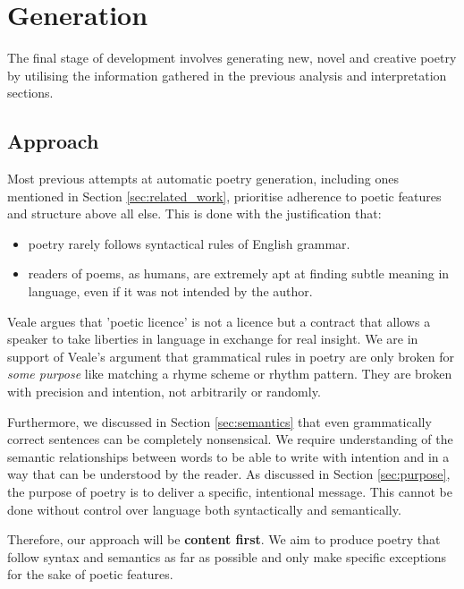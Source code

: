 \chapter{Generation}
\label{chp:generation}
\ifpdf
    \graphicspath{{Management/ManagementFigs/PNG/}{Management/ManagementFigs/PDF/}{Management/ManagementFigs/}}
\else
    \graphicspath{{Management/ManagementFigs/EPS/}{Management/ManagementFigs/}}
\fi

The final stage of development involves generating new, novel and creative poetry by utilising the information gathered in the previous analysis and interpretation sections.

\section{Approach}
Most previous attempts at automatic poetry generation, including ones mentioned in Section \ref{sec:related_work}, prioritise adherence to poetic features and structure above all else. This is done with the justification that:
\begin{itemize}
\item{poetry rarely follows syntactical rules of English grammar.}
\item{readers of poems, as humans, are extremely apt at finding subtle meaning in language, even if it was not intended by the author.}
\end{itemize}

Veale argues that 'poetic licence' is not a licence but a contract that allows a speaker to take liberties in language in exchange for real insight\cite{veale2013less}. We are in support of Veale's argument that grammatical rules in poetry are only broken for \textit{some purpose} like matching a rhyme scheme or rhythm pattern. They are broken with precision and intention, not arbitrarily or randomly.

Furthermore, we discussed in Section \ref{sec:semantics} that even grammatically correct sentences can be completely nonsensical. We require understanding of the semantic relationships between words to be able to write with intention and in a way that can be understood by the reader. As discussed in Section \ref{sec:purpose}, the purpose of poetry is to deliver a specific, intentional message. This cannot be done without control over language both syntactically and semantically.

Therefore, our approach will be \textbf{content first}. We aim to produce poetry that follow syntax and semantics as far as possible and only make specific exceptions for the sake of poetic features.

